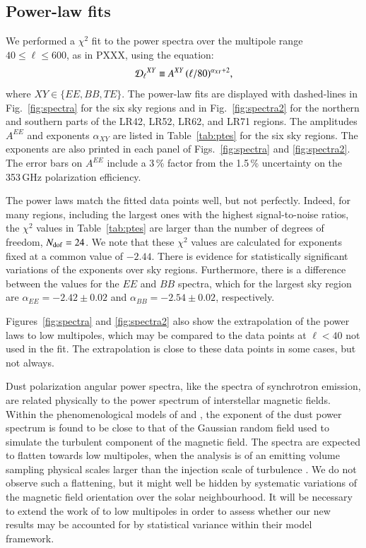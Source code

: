 \documentclass[longauth,traditabstract]{aa}
\newcommand{\valpee}{-2.42} %
\newcommand{\valpeeu}{0.02} %
\newcommand{\valpbb}{-2.54} %
\newcommand{\valpbbu}{0.02} %
\begin{document}
\subsection{Power-law fits}
\label{subsec:power_law_fits}

We performed a $\chi^2$ fit to the power spectra
over the multipole range $40 \le \ell \le 600$, as in PXXX, using the equation: 
\begin{equation}
\label{eq:power_law}
{\cal D_\ell}^{XY} \equiv A^{XY} \, (\ell/80)^{\alpha_{XY}+2},
\end{equation}
where $XY \in \{EE, BB, TE\}$.
The power-law fits are displayed with dashed-lines in Fig.~\ref{fig:spectra} for the six sky regions and in Fig.~\ref{fig:spectra2} for the northern and 
southern parts of the LR42, LR52, LR62, and LR71 regions.
The amplitudes $A^{EE}$ and exponents $\alpha_{XY}$
are listed in Table~\ref{tab:ptes} for the six sky regions. The exponents are also printed in each panel of Figs.~\ref{fig:spectra} and \ref{fig:spectra2}. 
The error bars on $A^{EE}$ include a 3\,\% factor from the 1.5\,\% uncertainty on the 353\,GHz 
polarization efficiency. 

The power laws match the fitted data points well, but not perfectly.  Indeed, for many regions, including the largest ones with the highest signal-to-noise ratios, the
$\chi^2$ values in Table~\ref{tab:ptes} are larger than the number of degrees of freedom, $N_{\rm dof} =24$.
We note that these $\chi^2$ values are calculated for exponents fixed at a common value of $-2.44$.
%
There is evidence for statistically significant variations of the exponents over sky regions.  Furthermore, there is a difference between the values for the $EE$ and $BB$ spectra, which for the largest sky region are
$\alpha_{EE} = \valpee\pm\valpeeu$ and $\alpha_{BB} = \valpbb\pm\valpbbu$, respectively.

Figures~\ref{fig:spectra} and \ref{fig:spectra2} also show the extrapolation of the power laws to low multipoles, which may be compared to the data points at $\ell < 40$ not used in the fit.  The extrapolation is close to these data points in some cases, but not always.

Dust polarization angular power spectra, like the spectra of synchrotron emission, are related physically to the power spectrum of interstellar magnetic fields. 
Within the phenomenological models of \citet{Ghosh16} and \citet{Vansyngel16}, the exponent of the dust power spectrum is found to be 
close to that of the Gaussian random field used to simulate the turbulent component of the magnetic field.
The spectra are expected to flatten towards low multipoles, when the analysis is of an emitting volume sampling physical scales larger
than the injection scale of turbulence \citep{Cho02}. We do not observe such a flattening, but it might well be hidden by systematic variations of the magnetic field orientation over the
solar neighbourhood.  It will be necessary to extend the work of \citet{Vansyngel16} to low multipoles in order to assess whether 
our new results may be accounted for by statistical variance within their model framework. 
\end{document}
